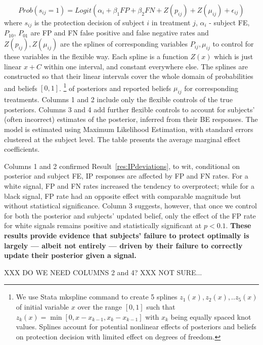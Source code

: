 \documentclass[12pt,a4paper]{article}
\newcommand{\agt}[1]{{\color{OliveGreen}#1}}
\begin{document}
	\[Prob(s_{ij}=1)=Logit(\alpha_i+\beta_1 FP +\beta_2 FN +Z(p_{ij})+Z(\mu_{ij})+\epsilon_{ij}) \]
where $s_{ij}$ is the protection decision of subject $i$ in treatment $j$, $\alpha_i$ - subject FE, $P_{10}$, $P_{01}$ are FP and FN false positive and false negative rates and $Z(p_{ij}),Z(\mu_{ij})$ are the splines of corresponding variables $P_{ij}, \mu_{ij}$ to control for these variables in the flexible way. Each spline is a function $Z(x)$ which is just linear $x+C$ within one interval, and constant everywhere else. The splines are constructed so that their linear intervals cover the whole domain of probabilities and beliefs $[0,1]$.  \footnote{We use Stata mkspline command to create 5 splines $z_1(x),z_2(x),..z_5(x)$ of initial variable $x$ over the range $[0,1]$ such that $z_k(x)=\min[0,x-x_{k-1},x_k-x_{k-1}]$ with $x_k$ being equally spaced knot values. Splines account for potential nonlinear effects of posteriors and beliefs on protection decision with limited effect on degrees of freedom.} of posteriors and reported beliefs $\mu_{ij}$ for corresponding treatments. Columns 1 and 2 include only the flexible controls of the true posteriors. Columns 3 and 4 add further flexible controls to account for subjects' (often incorrect) estimates of the posterior, inferred from their BE responses. The model is estimated using Maximum Likelihood Estimation, with standard errors clustered at the subject level. The table presents the average marginal effect coefficients.

Columns 1 and 2 confirmed Result~\ref{res:IPdeviations}, to wit, conditional on posterior and subject FE, IP responses are affected by FP and FN rates. For a white signal, FP and FN rates increased the tendency to overprotect; while for a black signal, FP rate had an opposite effect with comparable magnitude but without statistical significance. Column 3 suggests, however, that once we control for both the posterior and subjects' updated belief, only the effect of the FP rate for white signals remains positive and statistically significant at $p<0.1$. \textbf{These results provide evidence that subjects' failure to protect optimally is largely --- albeit not entirely --- driven by their failure to correctly update their posterior given a signal.}

\agt{XXX DO WE NEED COLUMNS 2 and 4? XXX NOT SURE...}
\end{document}
